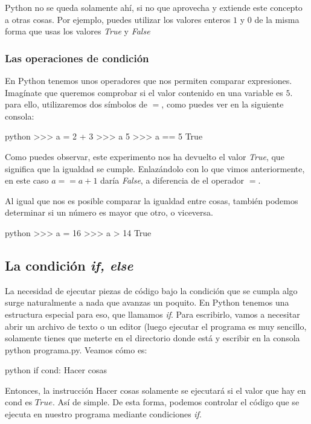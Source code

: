 \documentclass{article}
\begin{document}
Python no se queda solamente ahí, si no que aprovecha y extiende este concepto a otras cosas. Por ejemplo, puedes utilizar los valores enteros $1$ y $0$ de la misma forma que usas los valores \textit{True} y \textit{False}
\subsubsection{Las operaciones de condición}
En Python tenemos unos operadores que nos permiten comparar expresiones. Imagínate que queremos comprobar si el valor contenido en una variable es $5$. para ello, utilizaremos dos símbolos de $=$, como puedes ver en la siguiente consola:

\begin{mintedbox}{python}
>>> a = 2 + 3
>>> a
5
>>> a == 5
True
\end{mintedbox}

Como puedes observar, este experimento nos ha devuelto el valor \textit{True}, que significa que la igualdad se cumple. Enlazándolo con lo que vimos anteriormente, en este caso $a == a+1$ daría \textit{False}, a diferencia de el operador $=$.

Al igual que nos es posible comparar la igualdad entre cosas, también podemos determinar si un número es mayor que otro, o viceversa.

\begin{mintedbox}{python}
>>> a = 16
>>> a > 14
True
\end{mintedbox}

\subsection{La condición \textit{if, else}}
La necesidad de ejecutar piezas de código bajo la condición que se cumpla algo surge naturalmente a nada que avanzas un poquito. En Python tenemos una estructura especial para eso, que llamamos \textit{if}. Para escribirlo, vamos a necesitar abrir un archivo de texto o un editor (luego ejecutar el programa es muy sencillo, solamente tienes que meterte en el directorio donde está y escribir en la consola python programa.py. Veamos cómo es:

\begin{mintedbox}{python}
if cond:
    Hacer cosas
\end{mintedbox}

Entonces, la instrucción Hacer cosas solamente se ejecutará si el valor que hay en cond es $True$. Así de simple. De esta forma, podemos controlar el código que se ejecuta en nuestro programa mediante condiciones \textit{if}.
\end{document}

